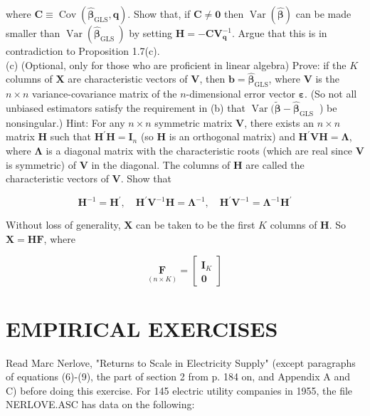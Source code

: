 \documentclass[10pt]{article}
\begin{document}
where $\mathbf{C} \equiv \operatorname{Cov}\left(\widehat{\boldsymbol{\beta}}_{\mathrm{GLS}}, \mathbf{q}\right)$. Show that, if $\mathbf{C} \neq \mathbf{0}$ then $\operatorname{Var}(\widehat{\boldsymbol{\beta}})$ can be made smaller than $\operatorname{Var}\left(\widehat{\boldsymbol{\beta}}_{\text {GLS }}\right)$ by setting $\mathbf{H}=-\mathbf{C V}_{\mathbf{q}}^{-1}$. Argue that this is in contradiction to Proposition 1.7(c).\\
(c) (Optional, only for those who are proficient in linear algebra) Prove: if the $K$ columns of $\mathbf{X}$ are characteristic vectors of $\mathbf{V}$, then $\mathbf{b}=\widehat{\boldsymbol{\beta}}_{\mathrm{GLS}}$, where $\mathbf{V}$ is the $n \times n$ variance-covariance matrix of the $n$-dimensional error vector $\boldsymbol{\varepsilon}$. (So not all unbiased estimators satisfy the requirement in (b) that $\operatorname{Var}(\widetilde{\boldsymbol{\beta}}- \widehat{\boldsymbol{\beta}}_{\text {GLS }}$ ) be nonsingular.) Hint: For any $n \times n$ symmetric matrix $\mathbf{V}$, there exists an $n \times n$ matrix $\mathbf{H}$ such that $\mathbf{H}^{\prime} \mathbf{H}=\mathbf{I}_{n}$ (so $\mathbf{H}$ is an orthogonal matrix) and $\mathbf{H}^{\prime} \mathbf{V H}=\boldsymbol{\Lambda}$, where $\boldsymbol{\Lambda}$ is a diagonal matrix with the characteristic roots (which are real since $\mathbf{V}$ is symmetric) of $\mathbf{V}$ in the diagonal. The columns of $\mathbf{H}$ are called the characteristic vectors of $\mathbf{V}$. Show that

$$
\mathbf{H}^{-1}=\mathbf{H}^{\prime}, \quad \mathbf{H}^{\prime} \mathbf{V}^{-1} \mathbf{H}=\mathbf{\Lambda}^{-1}, \quad \mathbf{H}^{\prime} \mathbf{V}^{-1}=\mathbf{\Lambda}^{-1} \mathbf{H}^{\prime}
$$

Without loss of generality, $\mathbf{X}$ can be taken to be the first $K$ columns of $\mathbf{H}$. So $\mathbf{X}=\mathbf{H F}$, where

$$
\underset{(n \times K)}{\mathbf{F}}=\left[\begin{array}{c}
\mathbf{I}_{K} \\
\mathbf{0}
\end{array}\right]
$$

\section*{EMPIRICAL EXERCISES}
Read Marc Nerlove, "Returns to Scale in Electricity Supply" (except paragraphs of equations (6)-(9), the part of section 2 from p. 184 on, and Appendix A and\\
C) before doing this exercise. For 145 electric utility companies in 1955, the file NERLOVE.ASC has data on the following:
\end{document}
